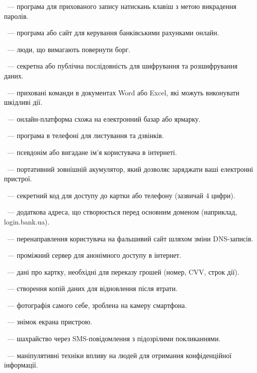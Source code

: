 ~--- програма для прихованого запису натискань клавіш з метою викрадення паролів.

~--- програма або сайт для керування банківськими рахунками онлайн.

~--- люди, що вимагають повернути борг.

~--- секретна або публічна послідовність для шифрування та розшифрування даних.

\newpage

~--- приховані команди в документах Word або Excel, які можуть виконувати шкідливі дії.

~--- онлайн-платформа схожа на електронний базар або ярмарку.

~--- програма в телефоні для листування та дзвінків.

~--- псевдонім або вигадане ім'я користувача в інтернеті.

~--- портативний зовнішній акумулятор, який дозволяє заряджати ваші електронні пристрої.

~--- секретний код для доступу до картки або телефону (зазвичай 4 цифри).

~--- додаткова адреса, що створюється перед основним доменом (наприклад, login.bank.ua).

~--- перенаправлення користувача на фальшивий сайт шляхом зміни DNS-записів.

~--- проміжний сервер для анонімного доступу в інтернет.

~--- дані про картку, необхідні для переказу грошей (номер, CVV, строк дії).

~--- створення копій даних для відновлення після втрати.

~--- фотографія самого себе, зроблена на камеру смартфона.

~--- знімок екрана пристрою.

~--- шахрайство через SMS-повідомлення з підозрілими покликаннями.

~--- маніпулятивні техніки впливу на людей для отримання конфіденційної інформації.

